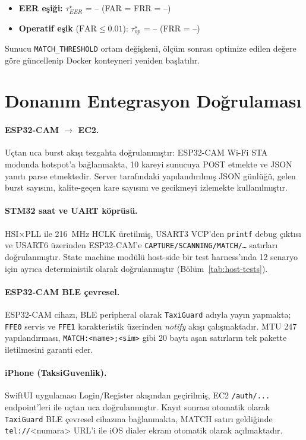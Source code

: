 \begin{itemize}
    \item \textbf{EER eşiği:} $\tau^\star_{EER}$ = -- (FAR = FRR = --)
    \item \textbf{Operatif eşik} ($\mathrm{FAR} \leq 0.01$): $\tau^\star_{op}$ = -- (FRR = --)
\end{itemize}

Sunucu \texttt{MATCH\_THRESHOLD} ortam değişkeni, ölçüm sonrası optimize
edilen değere göre güncellenip Docker konteyneri yeniden başlatılır.

\section{Donanım Entegrasyon Doğrulaması}

\paragraph{ESP32-CAM $\rightarrow$ EC2.} Uçtan uca burst akışı tezgahta
doğrulanmıştır: ESP32-CAM Wi-Fi STA modunda hotspot'a bağlanmakta, 10
kareyi sunucuya POST etmekte ve JSON yanıtı parse etmektedir. Server
tarafındaki yapılandırılmış JSON günlüğü, gelen burst sayısını,
kalite-geçen kare sayısını ve gecikmeyi izlemekte kullanılmıştır.

\paragraph{STM32 saat ve UART köprüsü.} HSI$\times$PLL ile 216~MHz HCLK
üretilmiş, USART3 VCP'den \texttt{printf} debug çıktısı ve USART6
üzerinden ESP32-CAM'e \texttt{CAPTURE/SCANNING/MATCH/\ldots} satırları
doğrulanmıştır. State machine modülü host-side bir test harness'ında
12 senaryo için ayrıca deterministik olarak doğrulanmıştır
(Bölüm~\ref{tab:host-tests}).

\paragraph{ESP32-CAM BLE çevresel.} ESP32-CAM cihazı, BLE peripheral
olarak \texttt{TaxiGuard} adıyla yayın yapmakta; \texttt{FFE0} servis
ve \texttt{FFE1} karakteristik üzerinden \emph{notify} akışı
çalışmaktadır. MTU 247 yapılandırması, \texttt{MATCH:<name>;<sim>}
gibi 20 baytı aşan satırların tek pakette iletilmesini garanti eder.

\paragraph{iPhone (TaksiGuvenlik).} SwiftUI uygulaması Login/Register
akışından geçirilmiş, EC2 \texttt{/auth/...} endpoint'leri ile
uçtan uca doğrulanmıştır. Kayıt sonrası otomatik olarak
\texttt{TaxiGuard} BLE çevresel cihazına bağlanmakta, MATCH satırı
geldiğinde \texttt{tel://}<numara> URL'i ile iOS dialer ekranı
otomatik olarak açılmaktadır.

